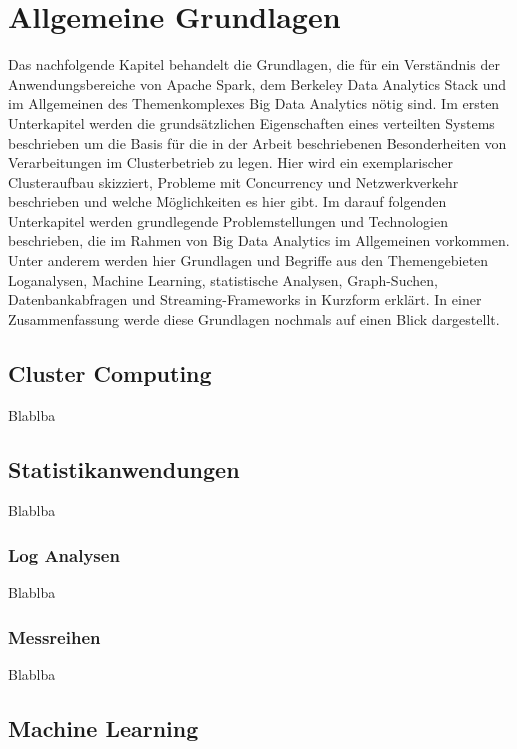 \chapter{Allgemeine Grundlagen }
\label{chapter:allgemeine Grundlagen}


Das nachfolgende Kapitel behandelt die Grundlagen, die für ein Verständnis der Anwendungsbereiche von Apache Spark, dem Berkeley Data Analytics Stack und im Allgemeinen des Themenkomplexes Big Data Analytics nötig sind. Im ersten Unterkapitel werden die grundsätzlichen Eigenschaften eines verteilten Systems beschrieben um die Basis für die in der Arbeit beschriebenen Besonderheiten von Verarbeitungen im Clusterbetrieb zu legen. Hier wird ein exemplarischer Clusteraufbau skizziert, Probleme mit Concurrency und Netzwerkverkehr beschrieben und welche Möglichkeiten es hier gibt.  Im darauf folgenden Unterkapitel werden grundlegende Problemstellungen und Technologien  beschrieben, die im Rahmen von Big Data Analytics im Allgemeinen vorkommen. Unter anderem werden hier Grundlagen und Begriffe aus den Themengebieten Loganalysen, Machine Learning, statistische Analysen, Graph-Suchen, Datenbankabfragen und Streaming-Frameworks in Kurzform erklärt. In einer Zusammenfassung werde diese Grundlagen nochmals auf einen Blick dargestellt. 

\section{Cluster Computing}
\label{section:cluster computing}

Blablba

\section{Statistikanwendungen}
\label{section:cluster computing}

Blablba

\subsection{Log Analysen}
\label{section:cluster computing}

Blablba

\subsection{Messreihen}
\label{section:cluster computing}

Blablba

\section{Machine Learning}
\label{section:cluster computing}

